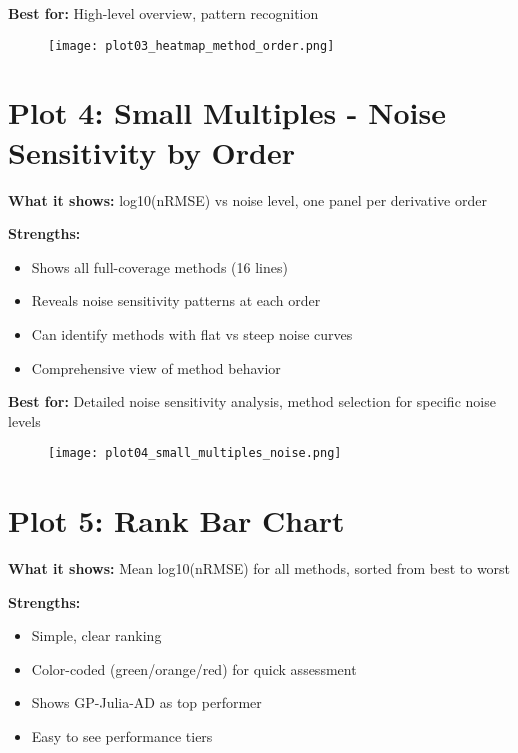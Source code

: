 \documentclass[11pt]{article}
\begin{document}
\textbf{Best for:} High-level overview, pattern recognition

\begin{figure}[h]
\centering
\texttt{[image: plot03\_heatmap\_method\_order.png]}
\end{figure}

\clearpage


\section*{Plot 4: Small Multiples - Noise Sensitivity by Order}

\textbf{What it shows:} log10(nRMSE) vs noise level, one panel per derivative order

\textbf{Strengths:}
\begin{itemize}
    \item Shows all full-coverage methods (16 lines)
    \item Reveals noise sensitivity patterns at each order
    \item Can identify methods with flat vs steep noise curves
    \item Comprehensive view of method behavior
\end{itemize}

\textbf{Best for:} Detailed noise sensitivity analysis, method selection for specific noise levels

\begin{figure}[h]
\centering
\texttt{[image: plot04\_small\_multiples\_noise.png]}
\end{figure}

\clearpage


\section*{Plot 5: Rank Bar Chart}

\textbf{What it shows:} Mean log10(nRMSE) for all methods, sorted from best to worst

\textbf{Strengths:}
\begin{itemize}
    \item Simple, clear ranking
    \item Color-coded (green/orange/red) for quick assessment
    \item Shows GP-Julia-AD as top performer
    \item Easy to see performance tiers
\end{itemize}
\end{document}
